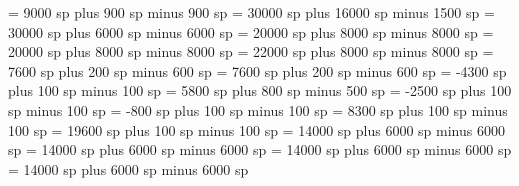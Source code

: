 \grespaceaftersigns= 9000 sp plus 900 sp minus 900 sp
\grespaceafterlineclef = 30000 sp plus 16000 sp minus 1500 sp 
\greinterwordspacenotes = 30000 sp plus 6000 sp minus 6000 sp
\greinterwordspacenotestext = 20000 sp plus 8000 sp minus 8000 sp
\greinterwordspacetextnotes = 20000 sp plus 8000 sp minus 8000 sp
\greinterwordspacetext = 22000 sp plus 8000 sp minus 8000 sp
\grebitrivirspace = 7600 sp plus 200 sp minus 600 sp
\grebitristrospace = 7600 sp plus 200 sp minus 600 sp
\grepunctuminclinatumshift= -4300 sp plus 100 sp minus 100 sp
\grebeforepunctainclinatashift= 5800 sp plus 800 sp minus 500 sp
\grepunctuminclinatumanddebilisshift= -2500 sp plus 100 sp minus 100 sp
\grepunctuminclinatumdebilisshift= -800 sp plus 100 sp minus 100 sp
\grepunctuminclinatumbigshift= 8300 sp plus 100 sp minus 100 sp
\grepunctuminclinatummaxshift= 19600 sp plus 100 sp minus 100 sp
\grespacearoundsmallbar = 14000 sp plus 6000 sp minus 6000 sp
\grespacearoundminor = 14000 sp plus 6000 sp minus 6000 sp
\grespacearoundmaior = 14000 sp plus 6000 sp minus 6000 sp
\grespacearoundfinalis = 14000 sp plus 6000 sp minus 6000 sp
